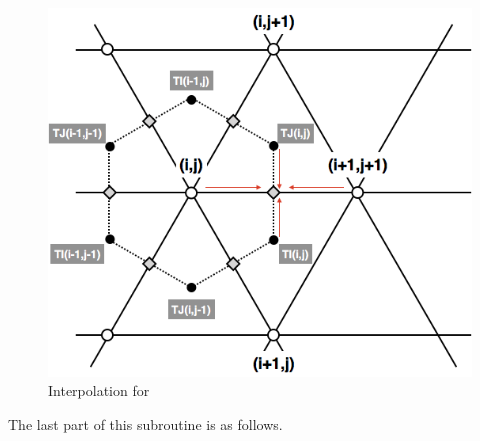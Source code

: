 \begin{figure}[htbp]
\centering
 \includegraphics[scale=.4]{figs/diffusion_diff.png}
 \caption{Interpolation for }\label{f:interpolation_for_dscl}
\end{figure}


The last part of this subroutine is as follows.


